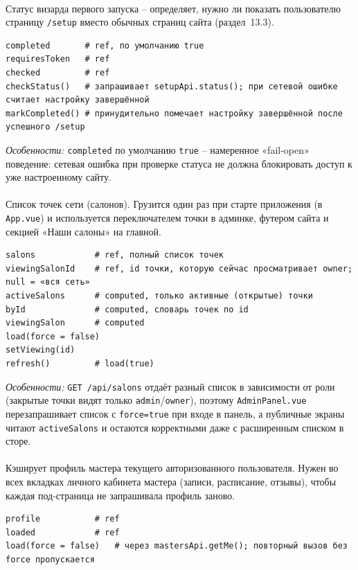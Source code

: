 \paragraph{}
Статус визарда первого запуска -- определяет, нужно ли показать
пользователю страницу \texttt{/setup} вместо обычных страниц сайта
(раздел~13.3).
\begin{verbatim}
completed       # ref, по умолчанию true
requiresToken   # ref
checked         # ref
checkStatus()   # запрашивает setupApi.status(); при сетевой ошибке считает настройку завершённой
markCompleted() # принудительно помечает настройку завершённой после успешного /setup
\end{verbatim}
\textit{Особенности:} \texttt{completed} по умолчанию \texttt{true} --
намеренное «fail-open» поведение: сетевая ошибка при проверке статуса не
должна блокировать доступ к уже настроенному сайту.

\paragraph{}
Список точек сети (салонов). Грузится один раз при старте приложения (в
\texttt{App.vue}) и используется переключателем точки в админке, футером
сайта и секцией «Наши салоны» на главной.
\begin{verbatim}
salons            # ref, полный список точек
viewingSalonId    # ref, id точки, которую сейчас просматривает owner; null = «вся сеть»
activeSalons      # computed, только активные (открытые) точки
byId              # computed, словарь точек по id
viewingSalon      # computed
load(force = false)
setViewing(id)
refresh()         # load(true)
\end{verbatim}
\textit{Особенности:} \texttt{GET /api/salons} отдаёт разный список в
зависимости от роли (закрытые точки видят только \texttt{admin}/\texttt{owner}),
поэтому \texttt{AdminPanel.vue} перезапрашивает список с
\texttt{force=true} при входе в панель, а публичные экраны читают
\texttt{activeSalons} и остаются корректными даже с расширенным списком
в сторе.

\paragraph{}
Кэширует профиль мастера текущего авторизованного пользователя. Нужен во
всех вкладках личного кабинета мастера (записи, расписание, отзывы),
чтобы каждая под-страница не запрашивала профиль заново.
\begin{verbatim}
profile           # ref
loaded            # ref
load(force = false)   # через mastersApi.getMe(); повторный вызов без force пропускается
\end{verbatim}

